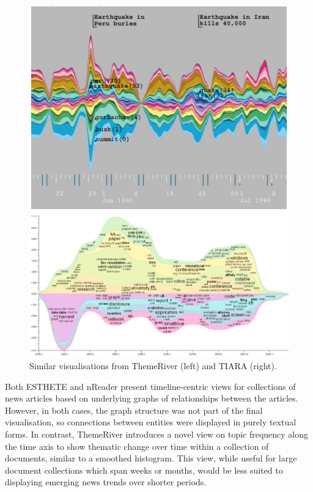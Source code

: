 \begin{figure}[h]
\centering
\begin{minipage}{.45\textwidth}
  \centering
  \hspace{-1cm}\includegraphics[width=.9\linewidth]{img/lit-survey/histogram1.png}
  \end{minipage}%
\begin{minipage}{.65\textwidth}
  \centering
  \hspace{-1.5cm}\includegraphics[width=.9\linewidth]{img/lit-survey/histogram2.png}
\end{minipage}
\caption{Similar visualisations from ThemeRiver \citep{ThemeRiver} (left) and TIARA \citep{InteractiveTopicBasedVisualTextSummarizationAndAnalysis} (right).}
  \label{fig:themeriver-tiara}
\end{figure}

Both ESTHETE \citep{ESTHETE} and nReader \citep{Nreader} present timeline-centric views for collections of news articles based on underlying graphs of relationships between the articles. However, in both cases, the graph structure was not part of the final visualisation, so connections between entities were displayed in purely textual forms. In contrast, ThemeRiver \citep{ThemeRiver} introduces a novel view on topic frequency along the time axis to show thematic change over time within a collection of documents, similar to a smoothed histogram. This view, while useful for large document collections which span weeks or months, would be less suited to displaying emerging news trends over shorter periods.

